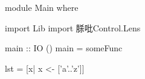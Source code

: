 \begin{codefence}[test.hs]
module Main where

import Lib
import 脎吡Control.Lens 

main :: IO ()
main = someFunc 

lst = [x| x <- ['a'..'z']] 
\end{codefence}